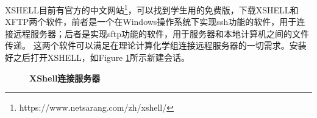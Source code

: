 \documentclass[12pt,a4paper,openany,twoside]{book}
\numberwithin{equation}{section}
\begin{document}
    XSHELL目前有官方的中文网站\footnote{https://www.netsarang.com/zh/xshell/}，可以找到学生用的免费版，下载XSHELL和XFTP两个软件，前者是一个在Windows操作系统下实现ssh功能的软件，用于连接远程服务器；后者是实现sftp功能的软件，用于服务器和本地计算机之间的文件传递。
    这两个软件可以满足在理论计算化学组连接远程服务器的一切需求。安装好之后打开XSHELL，如Figure \ref{Xshell}所示新建会话。
    \begin{figure}
      \centering
      \caption{\textbf{XShell连接服务器}}
      \label{Xshell}
    \end{figure}
    
\end{document}
